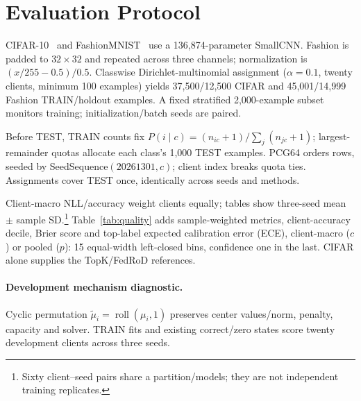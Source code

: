 \section{Evaluation Protocol}
CIFAR-10~\cite{krizhevsky2009tiny} and FashionMNIST~\cite{xiao2017fashion} use a 136,874-parameter SmallCNN. Fashion is padded to $32\times32$ and repeated across three channels; normalization is $(x/255-0.5)/0.5$. Classwise Dirichlet-multinomial assignment ($\alpha=0.1$, twenty clients, minimum 100 examples) yields 37,500/12,500 CIFAR and 45,001/14,999 Fashion TRAIN/holdout examples. A fixed stratified 2,000-example subset monitors training; initialization/batch seeds are paired.

Before TEST, TRAIN counts fix $P(i\mid c)=(n_{ic}+1)/\sum_j(n_{jc}+1)$; largest-remainder quotas allocate each class's 1,000 TEST examples. PCG64 orders rows, seeded by SeedSequence$(20261301,c)$; client index breaks quota ties. Assignments cover TEST once, identically across seeds and methods.

Client-macro NLL/accuracy weight clients equally; tables show three-seed mean $\pm$ sample SD.\footnote{Sixty client--seed pairs share a partition/models; they are not independent training replicates.} Table~\ref{tab:quality} adds sample-weighted metrics, client-accuracy decile, Brier score and top-label expected calibration error (ECE), client-macro ($c$) or pooled ($p$): 15 equal-width left-closed bins, confidence one in the last. CIFAR alone supplies the TopK/FedRoD references.

\paragraph{Development mechanism diagnostic.}
Cyclic permutation $\widetilde\mu_i=\operatorname{roll}(\mu_i,1)$ preserves center values/norm, penalty, capacity and solver. TRAIN fits and existing correct/zero states score twenty development clients across three seeds.
